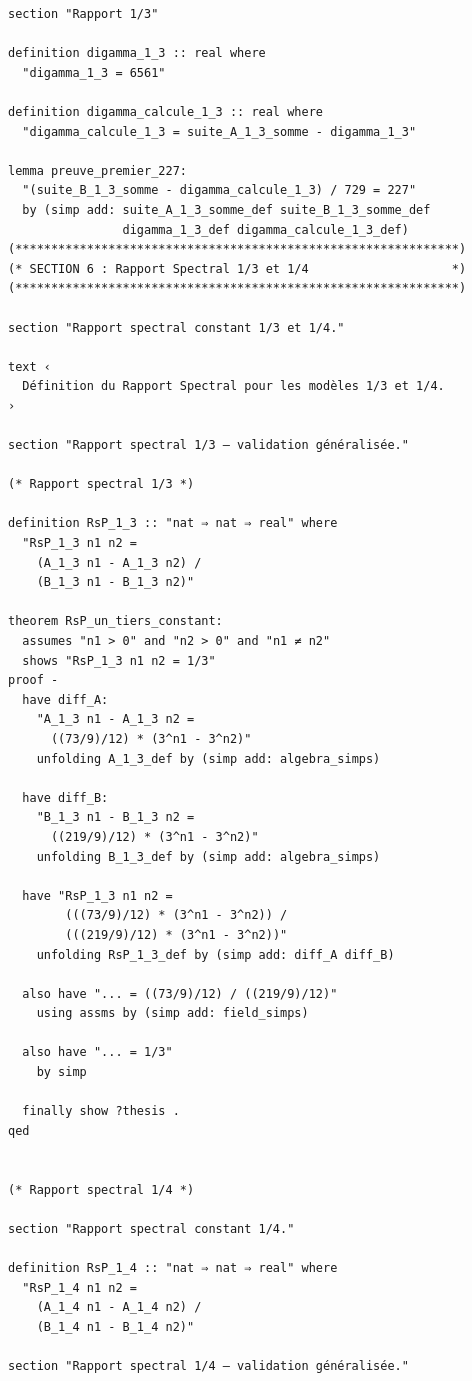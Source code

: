 \documentclass[a4paper,11pt]{article}
\begin{document}
\begin{holcode}[title={\textcolor{white}{Fichier : methode\_spectral.thy -- Partie 1/4}}]
\begin{lstlisting}
section "Rapport 1/3"

definition digamma_1_3 :: real where
  "digamma_1_3 = 6561"

definition digamma_calcule_1_3 :: real where
  "digamma_calcule_1_3 = suite_A_1_3_somme - digamma_1_3"

lemma preuve_premier_227:
  "(suite_B_1_3_somme - digamma_calcule_1_3) / 729 = 227"
  by (simp add: suite_A_1_3_somme_def suite_B_1_3_somme_def
                digamma_1_3_def digamma_calcule_1_3_def)
(**************************************************************)
(* SECTION 6 : Rapport Spectral 1/3 et 1/4                    *)
(**************************************************************)

section "Rapport spectral constant 1/3 et 1/4."

text ‹
  Définition du Rapport Spectral pour les modèles 1/3 et 1/4.
›

section "Rapport spectral 1/3 – validation généralisée."

(* Rapport spectral 1/3 *)

definition RsP_1_3 :: "nat ⇒ nat ⇒ real" where
  "RsP_1_3 n1 n2 =
    (A_1_3 n1 - A_1_3 n2) /
    (B_1_3 n1 - B_1_3 n2)"

theorem RsP_un_tiers_constant:
  assumes "n1 > 0" and "n2 > 0" and "n1 ≠ n2"
  shows "RsP_1_3 n1 n2 = 1/3"
proof -
  have diff_A:
    "A_1_3 n1 - A_1_3 n2 =
      ((73/9)/12) * (3^n1 - 3^n2)"
    unfolding A_1_3_def by (simp add: algebra_simps)

  have diff_B:
    "B_1_3 n1 - B_1_3 n2 =
      ((219/9)/12) * (3^n1 - 3^n2)"
    unfolding B_1_3_def by (simp add: algebra_simps)

  have "RsP_1_3 n1 n2 =
        (((73/9)/12) * (3^n1 - 3^n2)) /
        (((219/9)/12) * (3^n1 - 3^n2))"
    unfolding RsP_1_3_def by (simp add: diff_A diff_B)

  also have "... = ((73/9)/12) / ((219/9)/12)"
    using assms by (simp add: field_simps)

  also have "... = 1/3"
    by simp

  finally show ?thesis .
qed


(* Rapport spectral 1/4 *)

section "Rapport spectral constant 1/4."

definition RsP_1_4 :: "nat ⇒ nat ⇒ real" where
  "RsP_1_4 n1 n2 =
    (A_1_4 n1 - A_1_4 n2) /
    (B_1_4 n1 - B_1_4 n2)"

section "Rapport spectral 1/4 – validation généralisée."


\end{lstlisting}
\end{holcode}
\end{document}
